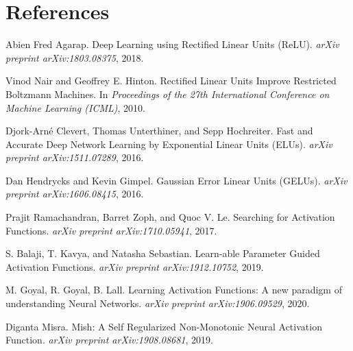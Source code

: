 \documentclass{article}
\begin{document}

\section{References}
\renewcommand{\refname}{} 
\begin{thebibliography}{99}

\vspace{-1cm}  %

Abien Fred Agarap.
\newblock Deep Learning using Rectified Linear Units (ReLU).
\newblock \textit{arXiv preprint arXiv:1803.08375}, 2018.


Vinod Nair and Geoffrey E. Hinton.
\newblock Rectified Linear Units Improve Restricted Boltzmann Machines.
\newblock In \textit{Proceedings of the 27th International Conference on Machine Learning (ICML)}, 2010.

Djork-Arné Clevert, Thomas Unterthiner, and Sepp Hochreiter.
\newblock Fast and Accurate Deep Network Learning by Exponential Linear Units (ELUs).
\newblock \textit{arXiv preprint arXiv:1511.07289}, 2016.

Dan Hendrycks and Kevin Gimpel.
\newblock Gaussian Error Linear Units (GELUs).
\newblock \textit{arXiv preprint arXiv:1606.08415}, 2016.



Prajit Ramachandran, Barret Zoph, and Quoc V. Le.
\newblock Searching for Activation Functions.
\newblock \textit{arXiv preprint arXiv:1710.05941}, 2017.

S. Balaji, T. Kavya, and Natasha Sebastian.
\newblock Learn-able Parameter Guided Activation Functions.
\newblock \textit{arXiv preprint arXiv:1912.10752}, 2019.


M. Goyal, R. Goyal, B. Lall.
\newblock Learning Activation Functions: A new paradigm of understanding Neural Networks.
\newblock \textit{arXiv preprint arXiv:1906.09529}, 2020.


Diganta Misra.
\newblock Mish: A Self Regularized Non-Monotonic Neural Activation Function.
\newblock \textit{arXiv preprint arXiv:1908.08681}, 2019.






\end{thebibliography}
\end{document}
